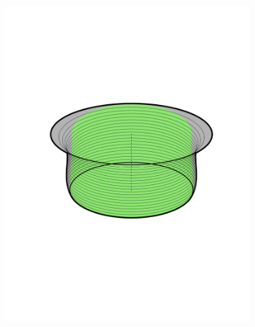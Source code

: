\begin{figure}
\begin{subfigure}[c]{0.3\textwidth}
    \includegraphics[width=\textwidth, trim={0cm 4cm 0cm
      4cm}]{figures/method/FunnelSimnew1}
  \end{subfigure}
  \begin{subfigure}[c]{0.3\textwidth}

\end{subfigure}
\end{figure}
